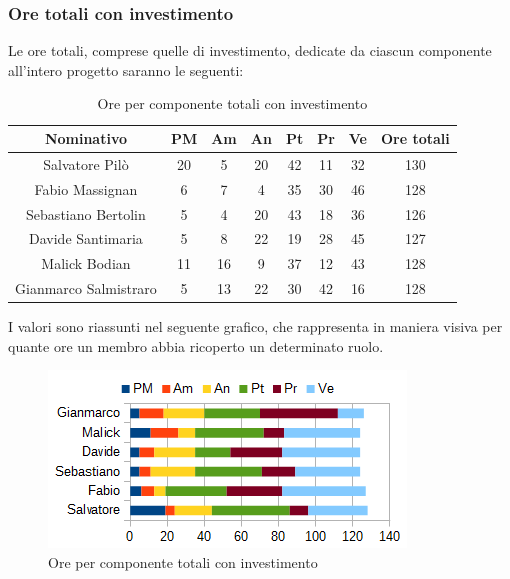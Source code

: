 		\subsubsection{Ore totali con investimento}
		Le ore totali, comprese quelle di investimento, dedicate da ciascun componente all'intero progetto saranno le seguenti: \\
		\begin{table}[H]
		\centering
		\begin{tabular}{|c|c|c|c|c|c|c|c|}
			\hline
			\textbf{Nominativo}		& \textbf{PM}	& \textbf{Am}	& \textbf{An}	& \textbf{Pt}	& \textbf{Pr}	& \textbf{Ve}	& \textbf{Ore totali}     \\
			\hline
			Salvatore Pilò			& 20	& 5		& 20	& 42	& 11	& 32	& 130 \\
			Fabio Massignan			& 6		& 7		& 4		& 35	& 30	& 46	& 128 \\
			Sebastiano Bertolin		& 5		& 4		& 20	& 43	& 18	& 36	& 126 \\
			Davide Santimaria		& 5		& 8		& 22	& 19	& 28	& 45	& 127 \\
			Malick Bodian			& 11	& 16	& 9		& 37	& 12	& 43	& 128 \\
			Gianmarco Salmistraro	& 5		& 13	& 22	& 30	& 42	& 16	& 128 \\
			\hline
		\end{tabular}
		\caption{Ore per componente totali con investimento}
		\end{table}
		I valori sono riassunti nel seguente grafico, che rappresenta in maniera visiva per quante ore un membro abbia ricoperto un determinato ruolo. \\
		\begin{figure}[H]
			\centering
			\includegraphics[width=1\linewidth]{immagini/grafici/riepilogo_conclusivo-barra.png}
			\caption{Ore per componente totali con investimento}
		\end{figure}
